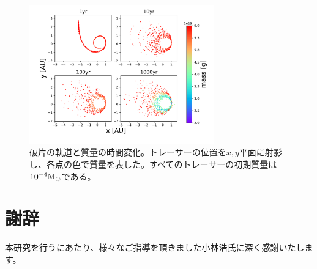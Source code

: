 \documentclass[a4paper,10pt,oneside,twocolumn,notitlepage,final]{jarticle}
\begin{document}

\begin{figure}[h]
 \centering
 \includegraphics[width=8cm]{L2cone30equidistant_v1011curl_OnlyPlanet_1000yr.pdf}
 \caption{破片の軌道と質量の時間変化。トレーサーの位置を$x,y$平面に射影し、各点の色で質量を表した。すべてのトレーサーの初期質量は${10^{-4}\rm M_{\oplus}}$である。\label{fig:L2cone}}
\end{figure}









\section*{謝辞}
本研究を行うにあたり、様々なご指導を頂きました小林浩氏に深く感謝いたします。
\end{document}
